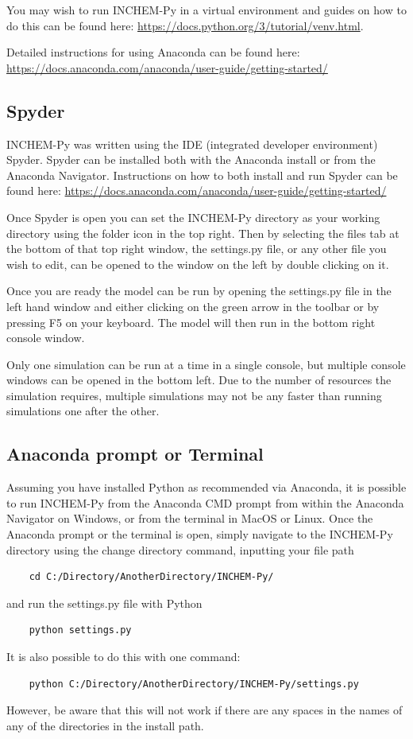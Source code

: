\documentclass[a4paper]{refart}
\begin{document}
You may wish to run INCHEM-Py in a virtual environment and guides on how to do this can be found here: \url{https://docs.python.org/3/tutorial/venv.html}.

Detailed instructions for using Anaconda can be found here: \url{https://docs.anaconda.com/anaconda/user-guide/getting-started/}

\subsection{Spyder}
INCHEM-Py was written using the IDE (integrated developer environment) Spyder. Spyder can be installed both with the Anaconda install or from the Anaconda Navigator. Instructions on how to both install and run Spyder can be found here: \url{https://docs.anaconda.com/anaconda/user-guide/getting-started/}

Once Spyder is open you can set the INCHEM-Py directory as your working directory using the folder icon in the top right. Then by selecting the files tab at the bottom of that top right window, the settings.py file, or any other file you wish to edit, can be opened to the window on the left by double clicking on it.

Once you are ready the model can be run by opening the settings.py file in the left hand window and either clicking on the green arrow in the toolbar or by pressing F5 on your keyboard. The model will then run in the bottom right console window.

Only one simulation can be run at a time in a single console, but multiple console windows can be opened in the bottom left. Due to the number of resources the simulation requires, multiple simulations may not be any faster than running simulations one after the other.

\subsection{Anaconda prompt or Terminal}
Assuming you have installed Python as recommended via Anaconda, it is possible to run INCHEM-Py from the Anaconda CMD prompt from within the Anaconda Navigator on Windows, or from the terminal in MacOS or Linux. Once the Anaconda prompt or the terminal is open, simply navigate to the INCHEM-Py directory using the change directory command, inputting your file path
\begin{verbatim}
    cd C:/Directory/AnotherDirectory/INCHEM-Py/
\end{verbatim}
and run the settings.py file with Python
\begin{verbatim}
    python settings.py
\end{verbatim}
It is also possible to do this with one command:
\begin{verbatim}
    python C:/Directory/AnotherDirectory/INCHEM-Py/settings.py
\end{verbatim}
However, be aware that this will not work if there are any spaces in the names of any of the directories in the install path.
\end{document}
